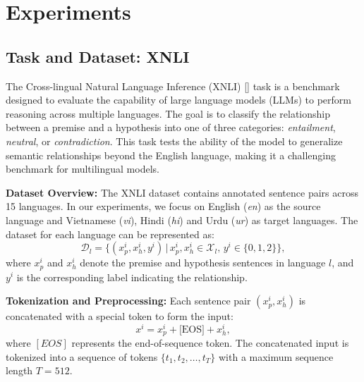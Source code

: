 
\chapter{Experiments}\singlespacing %

\label{Chapter4} %



\section{Task and Dataset: XNLI}

The Cross-lingual Natural Language Inference (XNLI) [\cite{xnli}] task is a benchmark designed to evaluate the capability of large language models (LLMs) to perform reasoning across multiple languages. The goal is to classify the relationship between a premise and a hypothesis into one of three categories: \textit{entailment}, \textit{neutral}, or \textit{contradiction}. This task tests the ability of the model to generalize semantic relationships beyond the English language, making it a challenging benchmark for multilingual models.

\textbf{Dataset Overview:} The XNLI dataset contains annotated sentence pairs across 15 languages. In our experiments, we focus on English (\textit{en}) as the source language and Vietnamese (\textit{vi}), Hindi (\textit{hi}) and Urdu (\textit{ur}) as target languages. The dataset for each language can be represented as:
\begin{equation}
	\mathcal{D}_l = \{(x_p^i, x_h^i, y^i) \,|\, x_p^i, x_h^i \in \mathcal{X}_l, \, y^i \in \{0, 1, 2\}\},
\end{equation}
where \(x_p^i\) and \(x_h^i\) denote the premise and hypothesis sentences in language \(l\), and \(y^i\) is the corresponding label indicating the relationship.

\textbf{Tokenization and Preprocessing:} Each sentence pair \((x_p^i, x_h^i)\) is concatenated with a special token to form the input:
\begin{equation}
	x^i = x_p^i + \text{[EOS]} + x_h^i,
\end{equation}
where \([EOS]\) represents the end-of-sequence token. The concatenated input is tokenized into a sequence of tokens \(\{t_1, t_2, \dots, t_T\}\) with a maximum sequence length \(T = 512\).

